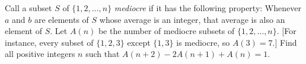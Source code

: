Call a subset $S$ of $\{1, 2, \dots, n\}$ \emph{mediocre} if it has the following property:
Whenever $a$ and $b$ are elements of $S$ whose average is an integer, that average is also
an element of $S$. Let $A(n)$ be the number of mediocre subsets of $\{1,2,\dots,n\}$.
[For instance, every subset of $\{1,2,3\}$ except $\{1,3\}$ is mediocre, so $A(3) =7$.]
Find all positive integers $n$ such that $A(n+2) - 2A(n+1) + A(n) = 1$.

